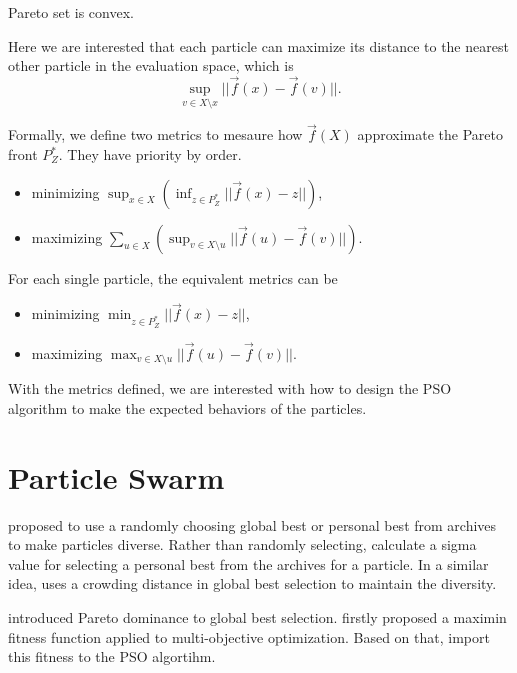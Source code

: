 \documentclass[12pt]{article}
\begin{document}
\begin{hyp}
\label{hyp:pareto_convex}
Pareto set is convex.
\end{hyp}

Here we are interested that each particle can maximize its distance to the nearest other particle in the evaluation space, which is
\begin{equation}
\label{eq:diversity_dist}
\sup_{v \in X \setminus x} || \vec{f}(x) - \vec{f}(v) ||.
\end{equation}


Formally, we define two metrics to mesaure how $ \vec{f}(X) $ approximate the Pareto front $ P^{*}_{Z} $. They have priority by order.
\begin{itemize}
\item minimizing $ \sup_{x \in X}  \left( \inf_{z \in P^{*}_{Z} } || \vec{f}(x) - z  || \right) $,
\item maximizing $ \sum_{u \in X} \left( \sup_{v \in X \setminus u} || \vec{f}(u) - \vec{f}(v) || \right) $.
\end{itemize}

For each single particle, the equivalent metrics can be 
\begin{itemize}
\item minimizing $  \min_{z \in P^{*}_{Z} } || \vec{f}(x) - z  ||  $,
\item maximizing $ \max_{v \in X \setminus u} || \vec{f}(u) - \vec{f}(v) ||  $.
\end{itemize}

With the metrics defined, we are interested with how to design the PSO algorithm to make the expected behaviors of the particles.

\section{Particle Swarm}

\cite{coello2002mopso} proposed to use a randomly choosing global best or personal best from archives to make particles diverse. 
Rather than randomly selecting, \cite{mostaghim2003strategies} calculate a sigma value for selecting a personal best from the archives for a particle.
In a similar idea, \cite{raquel2005effective} uses a crowding distance in global best selection to maintain the diversity.

\cite{alvarez2005mopso} introduced Pareto dominance to global best selection.
\cite{balling2003maximin} firstly proposed a maximin fitness function applied to multi-objective optimization. 
Based on that, \cite{li2004better} import this fitness to the PSO algortihm.
\end{document}
